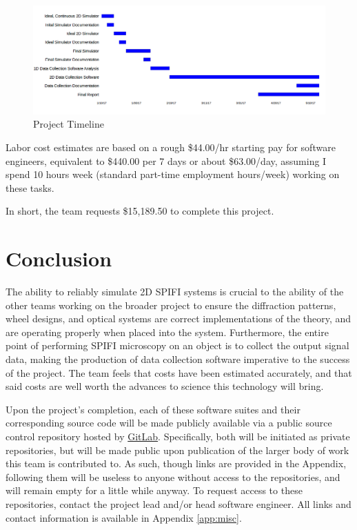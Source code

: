 \documentclass[12pt]{article}
\begin{document}
\begin{figure}[H]
\hspace{-40pt}
\includegraphics[width=1.2\textwidth]{timeline}
\caption{Project Timeline\label{chrt:time}}
\end{figure}

Labor cost estimates are
based on a rough \$44.00/hr starting pay for software engineers,
equivalent to \$440.00 per 7 days or about \$63.00/day, assuming I spend
10 hours week (standard part-time employment hours/week) working on these
tasks.

In short, the team requests \$15,189.50 to complete this project.
\section*{Conclusion}
The ability to reliably simulate 2D SPIFI systems is crucial to the ability
of the other teams working on the broader project to ensure the diffraction
patterns, wheel designs, and optical systems are correct implementations of
the theory, and are operating properly when placed into the system.
Furthermore, the entire point of performing SPIFI microscopy on an object
is to collect the output signal data, making the production of data
collection software imperative to the success of the project. The team
feels that costs have been estimated accurately, and that said costs are
well worth the advances to science this technology will bring.

Upon the project's completion, each of these software suites and their
corresponding source code will be made publicly available via a public
source control repository hosted by \href{http://www.gitlab.com}{GitLab}.
Specifically, both will be initiated as private repositories, but will be
made public upon publication of the larger body of work this team is
contributed to. As such, though links are provided in the Appendix,
following them will be useless to anyone without access to the
repositories, and will remain empty for a little while anyway. To request
access to these repositories, contact the project lead and/or head
software engineer. All links and contact information is available in
Appendix \ref{app:misc}.
\end{document}
